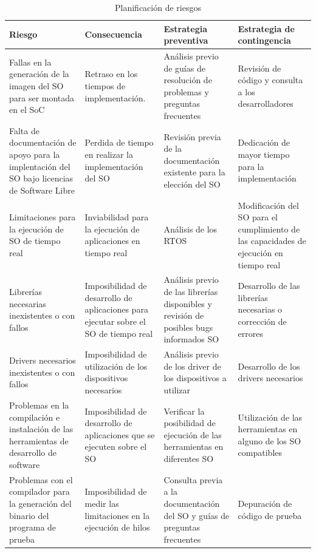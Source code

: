  \begin{table}[h!]
		\centering
		\begin{tabular}{ p{4cm} p{4cm} p{4cm} p{3cm} }
		\hline 
		\rowcolor[gray]{0.8} Riesgo & Consecuencia & Estrategia preventiva & Estrategia de contingencia\\
		\hline
		Fallas en la generación de la imagen del SO para ser montada en el SoC &Retraso en los tiempos de implementación.& Análisis previo de guías de resolución de problemas y preguntas frecuentes & Revisión de código y consulta a los desarrolladores\\		 
		\hline
		Falta de documentación de apoyo para la implentación del SO bajo licencias de Software Libre& Perdida de tiempo en realizar la implementación del SO & Revisión previa de la documentación existente para la elección del
SO & Dedicación de mayor tiempo para la implementación\\ 
		\hline
		 Limitaciones para la ejecución de SO de tiempo real & Inviabilidad para la ejecución
de aplicaciones en tiempo real & Análisis de los RTOS &Modificación del SO para el cumplimiento de las capacidades de ejecución en tiempo real\\
		\hline
		Librerías necesarias inexistentes o con fallos& Imposibilidad de desarrollo de aplicaciones para ejecutar sobre el SO de tiempo real& Análisis previo de las librerías disponibles y revisión de posibles bugs informados SO & Desarrollo de las librerías necesarias o corrección de errores\\			
		\hline
		Drivers necesarios inexistentes o con fallos & Imposibilidad de utilización
de los dispositivos necesarios&Análisis previo de los driver de los dispositivos a utilizar& Desarrollo de los drivers necesarios\\		
		\hline
		 Problemas en la compilación e instalación de las herramientas de desarrollo de software & Imposibilidad de desarrollo de aplicaciones que se ejecuten sobre el SO& Verificar la posibilidad de ejecución de las herramientas
en diferentes SO & Utilización de las herramientas en alguno de los SO compatibles\\
		\hline
		 Problemas con el compilador para la generación del binario del programa de prueba& Imposibilidad de medir las limitaciones en la ejecución de hilos & Consulta previa a la documentación del SO y guías de preguntas frecuentes & Depuración de código de prueba\\
		\hline
		\end{tabular}
		\caption{Planificación de riesgos}
		\end{table}

